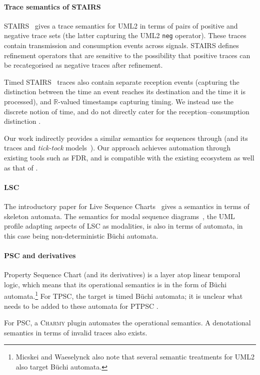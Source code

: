 \paragraph{Trace semantics of STAIRS}

STAIRS~\cite{Haugen03-STAIRS} gives a trace semantics for UML2 in terms
of pairs of positive and negative trace sets (the latter capturing the UML2
\texttt{neg} operator).  These traces contain
transmission and consumption events across signals.  STAIRS defines
refinement operators that are sensitive to the possibility that positive
traces can be recategorised as negative traces after refinement.

Timed
STAIRS~\cite{Haugen05-TimedSTAIRS} traces also contain separate reception
events (capturing the distinction between the time an event reaches
its destination and the time it is processed), and \(\mathbb R\)-valued
timestamps capturing timing.  We instead use the discrete \tockcsp{} notion
of time, and do not directly cater for the reception--consumption distinction
.

Our work indirectly provides a similar semantics for \langname{}
sequences through \tockcsp{} (and its traces and \emph{tick-tock} models~\cite{Baxter21-TickTock}).
Our approach achieves automation through existing tools such as FDR,
and is compatible with the existing \robostar{} ecosystem as well as that of
\tockcsp.

\paragraph{LSC}

The introductory paper for Live Sequence Charts~\cite{lsc} gives a
semantics in terms of skeleton automata.
The semantics for modal sequence diagrams~\cite{Harel08-ModalSD}, the
UML profile adapting aspects of LSC as modalities, is also in terms of
automata, in this case being
non-deterministic B\"uchi automata.

\paragraph{PSC and derivatives}

Property Sequence Chart (and its derivatives) is a layer atop
linear temporal logic, which means that its operational semantics is
in the form of B\"uchi automata.\footnote{
Micskei and Waeselynck also note that several semantic treatments for UML2 also
target B\"uchi automata.}
For TPSC, the target is timed B\"uchi
automata; it is unclear what needs to be added to these automata for PTPSC .


For PSC, a \textsc{Charmy} plugin automates the operational semantics.  A denotational semantics in terms of
invalid traces also exists.

